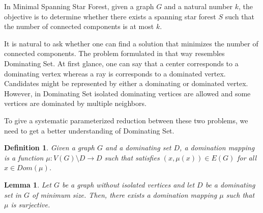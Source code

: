 \documentclass[en]{pracamgr}
\newtheorem{definition}{Definition}
\newtheorem{lemma}{Lemma}
\newcommand{\ssf}{spanning star forest}
\newcommand{\mssfp}{{\sc Minimal Spanning Star Forest}}
\newcommand{\domsetp}{{\sc Dominating Set}}
\begin{document}
In \mssfp{}, given a graph $G$ and a natural number $k$, the objective is to determine whether there exists a \ssf{} $S$ such that the number of connected components is at most $k$.

It is natural to ask whether one can find a solution that minimizes the number of connected components. The problem formulated in that way resembles \domsetp{}. At first glance, one can say that a center corresponds to a dominating vertex whereas a ray is corresponds to a dominated vertex. Candidates might be represented by either a dominating or dominated vertex. However, in \domsetp{} isolated dominating vertices are allowed and some vertices are dominated by multiple neighbors. 

To give a systematic parameterized reduction between these two problems, we need to get a better understanding of \domsetp{}.

\begin{definition}
	Given a graph $G$ and a dominating set $D$, a {\normalfont domination mapping} is a function $\mu:V(G) \setminus D \rightarrow D$ such that satisfies $(x,\mu(x)) \in E(G)$ for all $x \in Dom(\mu)$.
\end{definition}

\begin{lemma}\label{dom mapping}
	Let $G$ be a graph without isolated vertices and let $D$ be a dominating set in $G$ of minimum size. Then, there exists a domination mapping $\mu$ such that $\mu$ is surjective.
\end{lemma}
\end{document}
